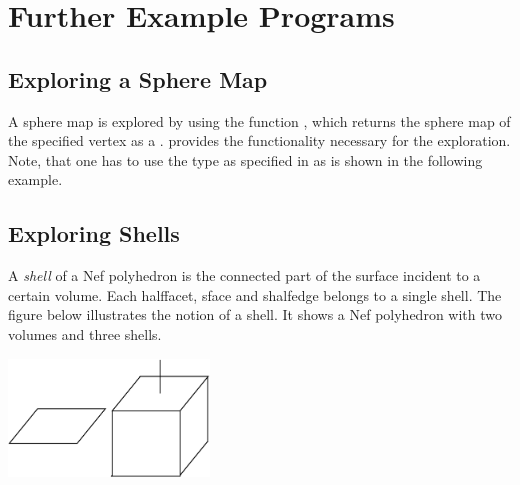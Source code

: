 
\section{Further Example Programs}

\subsection{Exploring a Sphere Map}

A sphere map is explored by using the function , which 
returns the sphere map of the specified vertex as a .
 provides the functionality necessary for the
exploration.
Note, that one has to use
the type  as specified in  as 
is shown in the following example.


\subsection{Exploring Shells}

A \emph{shell} of a Nef polyhedron is the connected part of the
surface incident to a certain volume.  Each halffacet, sface and
shalfedge belongs to a single shell. The figure below illustrates the
notion of a shell.  It shows a Nef polyhedron with two volumes and
three shells.

\begin{ccTexOnly}
    \begin{center}
      \parbox{0.4\textwidth}{%
          \includegraphics[width=0.4\textwidth]{Nef_3/fig/shells}%
      }
    \end{center}
\end{ccTexOnly}

